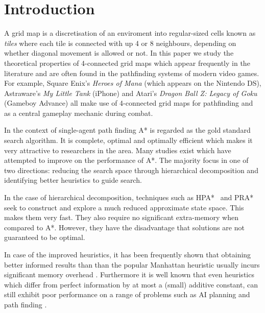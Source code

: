 \section{Introduction}
A grid map is a discretisation of an enviroment into regular-sized cells known as \emph{tiles}
where each tile is connected with up 4 or 8 neighbours, depending on whether diagonal movement
is allowed or not.
In this paper we study the theoretical properties of 4-connected grid maps which appear frequently 
in the literature \cite{yap,swamps,far} and are often found in the pathfinding systems of modern 
video games.
For example, Square Enix's \emph{Heroes of Mana} (which appears on the Nintendo DS),
Astraware's \emph{My Little Tank} (iPhone) and Atari's \emph{Dragon Ball Z: Legacy of Goku} 
(Gameboy Advance) all make use of 4-connected grid maps for pathfinding and as a central
gameplay mechanic during combat.
\par
In the context of single-agent path finding A* \cite{hart68} is regarded as 
the gold standard search algorithm.
It is complete, optimal and optimally efficient which makes it very attractive 
to researchers in the area.
Many studies exist which have attempted to improve on the performance of A*. 
The majority focus in one of two directions: reducing the search space through hierarchical 
decomposition and identifying better heuristics to guide search. 
\par
In the case of hierarchical decomposition, techniques such as
HPA*~\cite{botea04} and PRA*~\cite{sturtevant05} seek to construct and explore
a much reduced approximate state space.
This makes them very fast. 
They also require no significant extra-memory when compared to A*.
However, they have the disadvantage that solutions are not guaranteed to be optimal.
\par
In case of the improved heuristics, it has been frequently shown
that obtaining better informed results than than the popular
Manhattan heuristic usually incurs significant memory overhead 
\cite{goldberg05,Cazenave:06,bjornsson06}.
Furthermore it is well known that even heuristics which differ from perfect information 
by at most a (small) additive constant, can still exhibit poor performance on a range of 
problems such as AI planning and path finding \cite{helmert08,pohl77}.
\par
